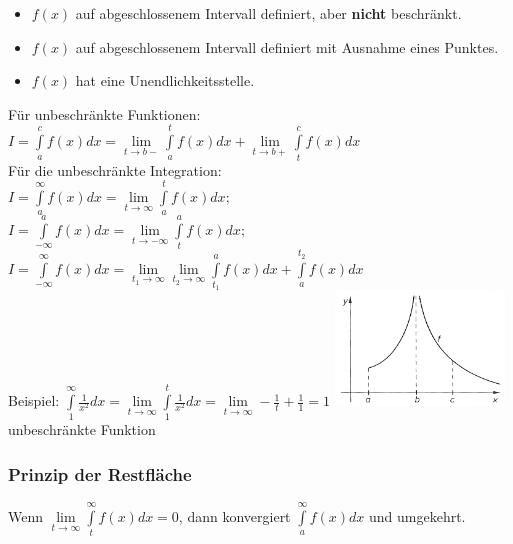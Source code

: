 	\begin{itemize}
		\setlength{\itemsep}{1pt}
		\setlength{\parskip}{0pt}
		\setlength{\parsep}{0pt}
		
	  	\item $f(x)$ auf abgeschlossenem Intervall definiert, aber \textbf{nicht}
	  	beschränkt.
		\item $f(x)$ auf abgeschlossenem Intervall definiert mit Ausnahme eines
		Punktes.
		\item $f(x)$ hat eine	 Unendlichkeitsstelle.
	\end{itemize}


  \begin{multicols}{2}
    F\"ur unbeschr\"ankte Funktionen:\\
    $ I =\int\limits _{a}^{c}f(x)dx=\lim\limits_{t\to
    b-}\int\limits_{a}^{t}f(x)dx+\lim\limits_{t\to b+}\int\limits_{t}^{c}f(x)dx
    $ \\
    F\"ur die unbeschr\"ankte Integration:\\
    $ I =\int\limits _{a} ^{\infty} f(x)dx= \lim \limits_{t\to \infty}\int \limits
    _{a} ^{t}f(x)dx; $ \\
    $ I =\int\limits ^{a} _{-\infty} f(x)dx= \lim \limits_{t\to -\infty}\int
    \limits _{t} ^{a}f(x)dx; $ \\
    $I =\int\limits _{-\infty} ^{\infty} f(x)dx = \lim \limits_{t_1\to \infty} \lim
    \limits
    _{t_2 \to  \infty}\int \limits _{t_1} ^{a}f(x)dx +
    \int\limits_{a}^{t_2}f(x)dx$\\
    Beispiel: $\int\limits_{1}^{\infty}\frac{1}{x^2}dx=\lim\limits_{t\to
    \infty}\int\limits_{1}^{t}\frac{1}{x^2}dx=\lim\limits_{t\to \infty}-\frac{1}{t}+\frac{1}{1}=1$
    \includegraphics[width=4.5cm]{./bilder/unbeschraenkteFunktion.png}\\
    unbeschr\"ankte Funktion
  \end{multicols}   
    
\subsubsection{Prinzip der Restfl\"ache}
  Wenn $\lim\limits_{t \rightarrow \infty} \int\limits^{\infty}_{t} f(x) dx = 0$, dann konvergiert
  $\int\limits_a^{\infty} f(x) dx$ und umgekehrt.

